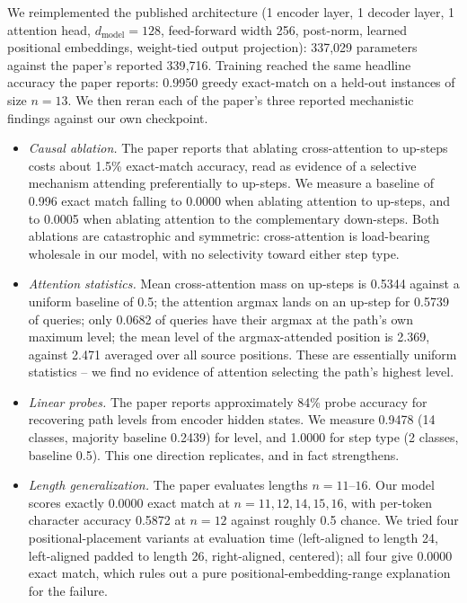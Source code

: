 We reimplemented the published architecture (1 encoder layer, 1 decoder
layer, 1 attention head, $d_{\mathrm{model}}=128$, feed-forward width 256,
post-norm, learned positional embeddings, weight-tied output projection):
337{,}029 parameters against the paper's reported 339{,}716. Training
reached the same headline accuracy the paper reports: 0.9950 greedy
exact-match on a held-out instances of size $n=13$. We then reran each of the
paper's three reported mechanistic findings against our own checkpoint.

\begin{itemize}
\item \emph{Causal ablation.} The paper reports that ablating
cross-attention to up-steps costs about 1.5\% exact-match accuracy, read
as evidence of a selective mechanism attending preferentially to up-steps.
We measure a baseline of 0.996 exact match falling to 0.0000 when
ablating attention to up-steps, and to 0.0005 when ablating attention to
the complementary down-steps. Both ablations are catastrophic and
symmetric: cross-attention is load-bearing wholesale in our model, with no
selectivity toward either step type.

\item \emph{Attention statistics.} Mean cross-attention mass on up-steps
is 0.5344 against a uniform baseline of 0.5; the attention argmax lands on
an up-step for 0.5739 of queries; only 0.0682 of queries have their argmax
at the path's own maximum level; the mean level of the argmax-attended
position is 2.369, against 2.471 averaged over all source positions. These
are essentially uniform statistics -- we find no evidence of attention
selecting the path's highest level.

\item \emph{Linear probes.} The paper reports approximately 84\% probe
accuracy for recovering path levels from encoder hidden states. We measure
0.9478 (14 classes, majority baseline 0.2439) for level, and 1.0000 for
step type (2 classes, baseline 0.5). This one direction replicates, and in
fact strengthens.

\item \emph{Length generalization.} The paper evaluates lengths
$n = 11$--$16$. Our model scores exactly 0.0000 exact match at
$n = 11, 12, 14, 15, 16$, with per-token character accuracy 0.5872 at
$n=12$ against roughly 0.5 chance. We tried four positional-placement
variants at evaluation time (left-aligned to length 24, left-aligned
padded to length 26, right-aligned, centered); all four give 0.0000 exact
match, which rules out a pure positional-embedding-range explanation for
the failure.
\end{itemize}

